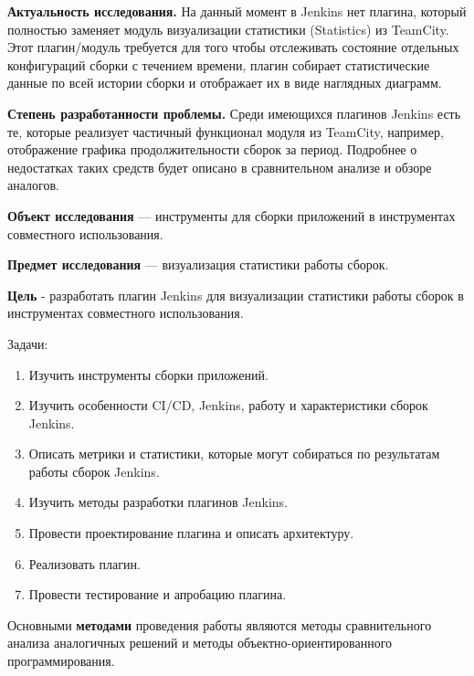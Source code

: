 \textbf{Актуальность исследования.} На данный момент в Jenkins нет плагина, который полностью заменяет модуль визуализации статистики (Statistics) из TeamCity. Этот плагин/модуль требуется для того чтобы отслеживать состояние отдельных конфигураций сборки с течением времени, плагин собирает статистические данные по всей истории сборки и отображает их в виде наглядных диаграмм.

\textbf{Степень разработанности проблемы.} Среди имеющихся плагинов Jenkins есть те, которые реализует частичный функционал модуля из TeamCity, например, отображение графика продолжительности сборок за период. Подробнее о недостатках таких средств будет описано в сравнительном анализе и обзоре аналогов. 


\textbf{Объект исследования} — инструменты для сборки приложений в инструментах совместного использования.

\textbf{Предмет исследования} — визуализация статистики работы сборок.

\textbf{Цель} - разработать плагин Jenkins для визуализации статистики работы сборок в инструментах совместного использования.

Задачи:
 
\begin{enumerate}
	\item Изучить инструменты сборки приложений.
	
	\item Изучить особенности CI/CD, Jenkins, работу и характеристики сборок Jenkins.
	
	\item Описать метрики и статистики, которые могут собираться по результатам работы сборок Jenkins.
	
	\item Изучить методы разработки плагинов Jenkins.
	
	\item Провести проектирование плагина и описать архитектуру.
	
	\item Реализовать плагин.
	
	\item Провести тестирование и апробацию плагина. 
	
\end{enumerate}

Основными \textbf{методами} проведения работы являются методы сравнительного анализа аналогичных решений и методы объектно-ориентированного программирования.




